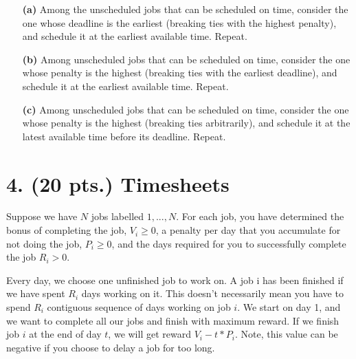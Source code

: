 \documentclass[11pt]{article}
\begin{document}
\begin{itemize}
\begin{itemize}
 
\item[{\bf (a)}] Among the unscheduled jobs that can be scheduled on time, consider the
one whose deadline is the earliest (breaking ties with the highest penalty), and schedule 
it at the earliest available time. Repeat.
 
\item[{\bf (b)}] Among unscheduled jobs that can be scheduled on time, consider the one
 whose penalty is the highest (breaking ties with the earliest deadline), and schedule
 it at the earliest available time. Repeat.

\item[{\bf (c)}] Among unscheduled jobs that can be scheduled on time, consider the one
 whose penalty is the highest (breaking ties arbitrarily), and schedule it at the latest
 available time before its deadline. Repeat.
\end{itemize}

\label{pg:end-of-p3}

%

\newpage

\section*{4. (20 pts.) Timesheets}

Suppose we have $N$ jobs labelled $1,...,N$. For each job, you have determined the
bonus of completing the job, $V_i \geq 0$, a penalty per day that you accumulate
for not doing the job, $P_i \geq 0$, and the days required for you to successfully 
complete the job $R_i > 0$.

Every day, we choose one unfinished job to work on. A job i has been finished if we
 have spent $R_i$ days working on it. This doesn’t necessarily mean you have to spend
 $R_i$ contiguous sequence of days working on job $i$. We start on day 1, and we want
 to complete all our jobs and finish with maximum reward. If we finish job $i$ at the
 end of day $t$, we will get reward $V_i − t *P_i$. Note, this value can be negative 
if you choose to delay a job for too long.


\end{itemize}
\end{document}
